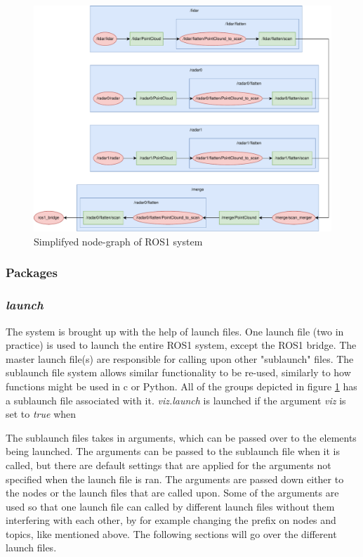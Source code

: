 \begin{figure}[H]
\centering
\includegraphics[scale=0.65]{Figures/draw.io/sipleRqtRos1.drawio.pdf}
  \caption{Simplifyed node-graph of ROS1 system}
  \label{fig:simpleRos1Rqt}
\end{figure}


\subsubsection{Packages}

\subsubsection{\textit{launch}}
The system is brought up with the help of launch files. One launch file (two in practice) is used to launch the entire ROS1 system, except the ROS1 bridge. The master launch file(s) are responsible for calling upon other "sublaunch" files. The sublaunch file system allows similar functionality to be re-used, similarly to how functions might be used in c or Python. All of the groups depicted in figure \ref{fig:simpleRos1Rqt} has a sublaunch file associated with it. \textit{viz.launch} is launched if the argument \textit{viz} is set to \textit{true} when 

The sublaunch files takes in arguments, which can be passed over to the elements being launched. The arguments can be passed to the sublaunch file when it is called, but there are default settings that are applied for the arguments not specified when the launch file is ran. The arguments are passed down either to the nodes or the launch files that are called upon. Some of the arguments are used so that one launch file can called by different launch files without them interfering with each other, by for example changing the prefix on nodes and topics, like mentioned above. The following sections will go over the different launch files.

